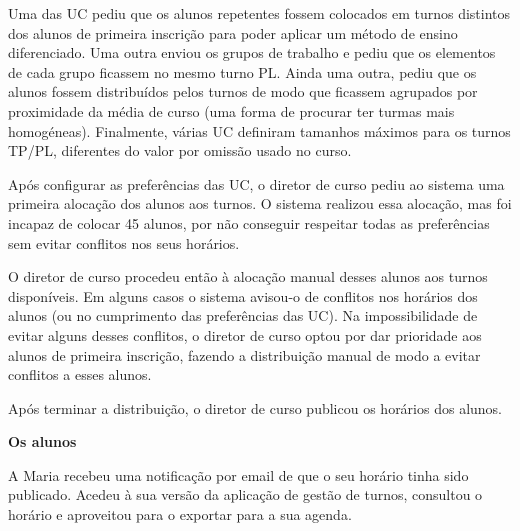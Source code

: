 \documentclass[12pt, a4paper]{article}
\begin{document}
Uma das UC pediu que os alunos repetentes fossem colocados em turnos distintos dos alunos de
primeira inscrição para poder aplicar um método de ensino diferenciado. Uma outra enviou os grupos
de trabalho e pediu que os elementos de cada grupo ficassem no mesmo turno PL. Ainda uma outra,
pediu que os alunos fossem distribuídos pelos turnos de modo que ficassem agrupados por proximidade
da média de curso (uma forma de procurar ter turmas mais homogéneas). Finalmente, várias UC
definiram tamanhos máximos para os turnos TP/PL, diferentes do valor por omissão usado no curso.

Após configurar as preferências das UC, o diretor de curso pediu ao sistema uma primeira alocação
dos alunos aos turnos. O sistema realizou essa alocação, mas foi incapaz de colocar 45 alunos, por
não conseguir respeitar todas as preferências sem evitar conflitos nos seus horários.

O diretor de curso procedeu então à alocação manual desses alunos aos turnos disponíveis. Em alguns
casos o sistema avisou-o de conflitos nos horários dos alunos (ou no cumprimento das preferências
das UC). Na impossibilidade de evitar alguns desses conflitos, o diretor de curso optou por dar
prioridade aos alunos de primeira inscrição, fazendo a distribuição manual de modo a evitar
conflitos a esses alunos.

Após terminar a distribuição, o diretor de curso publicou os horários dos alunos.

\textbf{Os alunos}

A Maria recebeu uma notificação por email de que o seu horário tinha sido publicado. Acedeu à sua
versão da aplicação de gestão de turnos, consultou o horário e aproveitou para o exportar para a
sua agenda.
\end{document}
